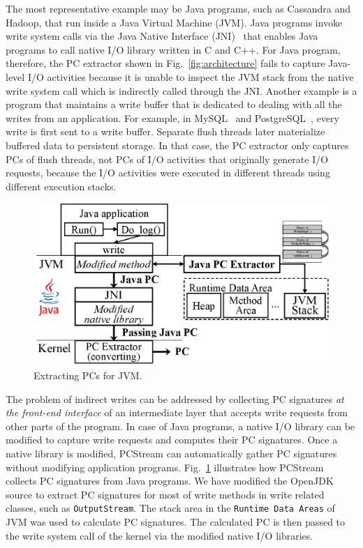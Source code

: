The most representative example may be Java programs, such as Cassandra and
Hadoop, that run inside a Java Virtual Machine (JVM). Java programs invoke
write system calls via the Java Native Interface (JNI)~\cite{JNI} that enables
Java programs to call native I/O library written in C and C++.
For Java program, therefore, the PC extractor shown in Fig.~\ref{fig:architecture} fails
to capture Java-level I/O activities because it is unable to inspect the JVM  
stack from the native write system call which is indirectly called through the JNI.
Another example is a program that maintains a write buffer that is
dedicated to dealing with all the writes from an application. For example, in
MySQL~\cite{MySQL} and PostgreSQL~\cite{PostgreSQL}, every write is first
sent to a write buffer. Separate flush threads later materialize buffered data
to persistent storage.  In that case, the PC extractor only captures PCs of
flush threads, not PCs of I/O activities that originally generate I/O requests,
because the I/O activities were executed in different threads using different
execution stacks.

\begin{figure}[t]
\centering
	\includegraphics[width=0.7\linewidth]{figure/jvmpc}
	\vspace{-10pt}
	\caption{Extracting PCs for JVM.}
\label{fig:java}
	\vspace{-15pt}
\end{figure}


The problem of indirect writes can be addressed by collecting PC signatures 
{\it at the front-end interface} of an intermediate layer that accepts write requests
from other parts of the program. In case of Java programs, a native I/O library can
be modified to capture write requests and computes their PC signatures. Once a native
library is modified, \textsf{\small PCStream} can automatically gather PC signatures without modifying
application programs. Fig.~\ref{fig:java} illustrates how \textsf{PCStream}
collects PC signatures from Java programs.  We have modified the OpenJDK~\cite{OpenJDK} 
source to extract PC signatures for most of write methods in
write related classes, such as \texttt{OutputStream}.  The stack area in the
\texttt{Runtime Data Areas} of JVM was used to calculate PC signatures.  The
calculated PC is then passed to the write system call of the kernel via the
modified native I/O libraries.

